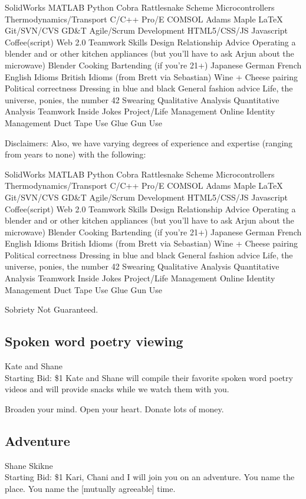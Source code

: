 \documentclass[11pt]{article}
\begin{document}
SolidWorks
MATLAB
Python
Cobra
Rattlesnake
Scheme
Microcontrollers
Thermodynamics/Transport
C/C++
Pro/E
COMSOL
Adams
Maple
LaTeX
Git/SVN/CVS
GD\&T
Agile/Scrum Development
HTML5/CSS/JS
Javascript
Coffee(script)
Web  2.0
Teamwork Skills
Design
Relationship Advice
Operating a blender and or other kitchen appliances (but you'll have to ask Arjun about the microwave)
Blender
Cooking
Bartending (if you're 21+)
Japanese
German
French
English Idioms
British Idioms (from Brett via Sebastian)
Wine + Cheese pairing
Political correctness
Dressing in blue and black
General fashion advice
Life, the universe, ponies, the number 42
Swearing
Qualitative Analysis
Quantitative Analysis 
Teamwork
Inside Jokes
Project/Life Management
Online Identity Management
Duct Tape Use
Glue Gun Use

Disclaimers: Also, we have varying degrees of experience and expertise (ranging from years to none) with the following:

SolidWorks
MATLAB
Python
Cobra
Rattlesnake
Scheme
Microcontrollers
Thermodynamics/Transport
C/C++
Pro/E
COMSOL
Adams
Maple
LaTeX
Git/SVN/CVS
GD\&T
Agile/Scrum Development
HTML5/CSS/JS
Javascript
Coffee(script)
Web  2.0
Teamwork Skills
Design
Relationship Advice
Operating a blender and or other kitchen appliances (but you'll have to ask Arjun about the microwave)
Blender
Cooking
Bartending (if you're 21+)
Japanese
German
French
English Idioms
British Idioms (from Brett via Sebastian)
Wine + Cheese pairing
Political correctness
Dressing in blue and black
General fashion advice
Life, the universe, ponies, the number 42
Swearing
Qualitative Analysis
Quantitative Analysis 
Teamwork
Inside Jokes
Project/Life Management
Online Identity Management
Duct Tape Use
Glue Gun Use

Sobriety Not Guaranteed.
\subsection{Spoken word poetry viewing}
Kate and Shane
\\
Starting Bid: \$1
\newline
Kate and Shane will compile their favorite spoken word poetry videos and will provide snacks while we watch them with you.

Broaden your mind. Open your heart. Donate lots of money.
\subsection{Adventure}
Shane Skikne
\\
Starting Bid: \$1
\newline
Kari, Chani and I will join you on an adventure. You name the place. You name the [mutually agreeable] time.
\end{document}
